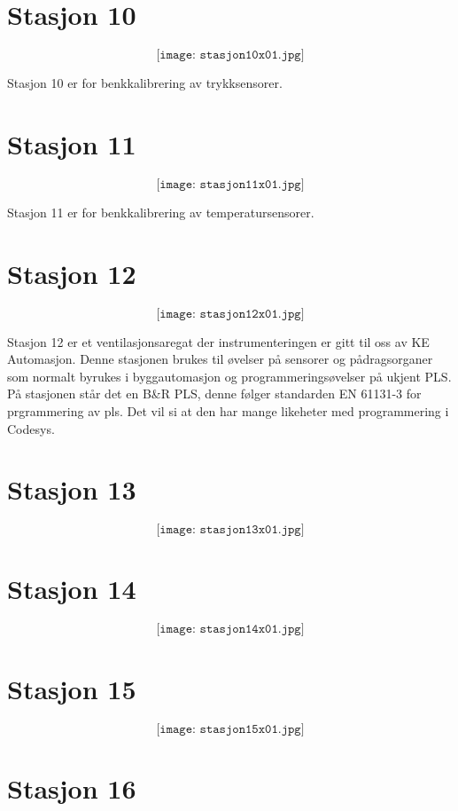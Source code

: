 \section{Stasjon 10}

$$\texttt{[image: stasjon10x01.jpg]}$$

Stasjon 10 er for benkkalibrering av trykksensorer. 
\section{Stasjon 11}

$$\texttt{[image: stasjon11x01.jpg]}$$

Stasjon 11 er for benkkalibrering av temperatursensorer. 

\section{Stasjon 12}

$$\texttt{[image: stasjon12x01.jpg]}$$

Stasjon 12 er et ventilasjonsaregat der instrumenteringen er gitt til oss av KE Automasjon. Denne stasjonen brukes til øvelser på sensorer og pådragsorganer som normalt byrukes i byggautomasjon og programmeringsøvelser på ukjent PLS. På stasjonen står det en B\&R PLS, denne følger standarden EN 61131-3 for prgrammering av pls. Det vil si at den har mange likeheter med programmering i Codesys. 
\section{Stasjon 13}

$$\texttt{[image: stasjon13x01.jpg]}$$


\section{Stasjon 14}

$$\texttt{[image: stasjon14x01.jpg]}$$


\section{Stasjon 15}

$$\texttt{[image: stasjon15x01.jpg]}$$


\section{Stasjon 16}

